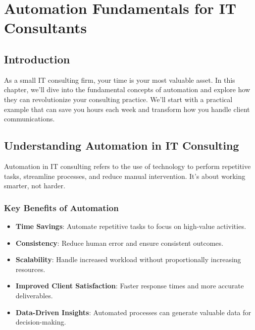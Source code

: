 \chapter{Automation Fundamentals for IT Consultants}


\section{Introduction}

As a small IT consulting firm, your time is your most valuable asset. In this chapter, we'll dive into the fundamental concepts of automation and explore how they can revolutionize your consulting practice. We'll start with a practical example that can save you hours each week and transform how you handle client communications.


\section{Understanding Automation in IT Consulting}

Automation in IT consulting refers to the use of technology to perform repetitive tasks, streamline processes, and reduce manual intervention. It's about working smarter, not harder.

\subsection{Key Benefits of Automation}

\begin{itemize}
    \item \textbf{Time Savings}: Automate repetitive tasks to focus on high-value activities.
    \item \textbf{Consistency}: Reduce human error and ensure consistent outcomes.
    \item \textbf{Scalability}: Handle increased workload without proportionally increasing resources.
    \item \textbf{Improved Client Satisfaction}: Faster response times and more accurate deliverables.
    \item \textbf{Data-Driven Insights}: Automated processes can generate valuable data for decision-making.
\end{itemize}

